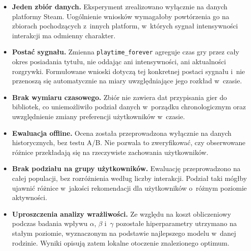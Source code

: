 \begin{itemize}
    \item \textbf{Jeden zbiór danych.} Eksperyment zrealizowano wyłącznie na
    danych platformy Steam. Uogólnienie wniosków wymagałoby powtórzenia go na
    zbiorach pochodzących z~innych platform, w~których sygnał intensywności
    interakcji ma odmienny charakter.

    \item \textbf{Postać sygnału.} Zmienna \texttt{playtime\_forever} agreguje
    czas gry przez cały okres posiadania tytułu, nie oddając ani intensywności,
    ani aktualności rozgrywki. Formułowane wnioski dotyczą tej konkretnej
    postaci sygnału i~nie przenoszą się automatycznie na miary uwzględniające
    jego rozkład w~czasie.

    \item \textbf{Brak wymiaru czasowego.} Zbiór nie zawiera dat przypisania
    gier do bibliotek, co uniemożliwiło podział danych w~porządku
    chronologicznym oraz uwzględnienie zmiany preferencji użytkowników w~czasie.

    \item \textbf{Ewaluacja offline.} Ocena została przeprowadzona wyłącznie na
    danych historycznych, bez testu A/B. Nie pozwala to zweryfikować, czy
    obserwowane różnice przekładają się na rzeczywiste zachowania użytkowników.

    \item \textbf{Brak podziału na grupy użytkowników.} Ewaluację
    przeprowadzono na całej populacji, bez rozróżnienia według liczby
    interakcji. Podział taki mógłby ujawnić różnice w~jakości rekomendacji dla
    użytkowników o~różnym poziomie aktywności.

    \item \textbf{Uproszczenia analizy wrażliwości.} Ze względu na koszt
    obliczeniowy podczas badania wpływu $\alpha$, $\beta$ i~$\gamma$ pozostałe
    hiperparametry utrzymano na stałym poziomie, wyznaczonym na podstawie
    najlepszego modelu w~danej rodzinie. Wyniki opisują zatem lokalne otoczenie
    znalezionego optimum.
\end{itemize}